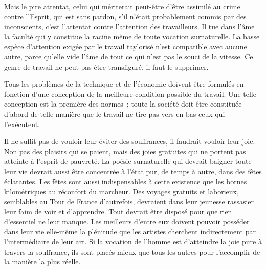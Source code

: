 \documentclass[french,twoside]{book} %
\newif\ifdev
\renewcommand{\LettrineFontHook}{\color{rubric}}
\newcommand{\initialiv}[2]{%
  \let\oldLFH\LettrineFontHook
  \IfSubStr{QJ’}{#1}{
    \lettrine[lines=4, lhang=0.2, loversize=-0.1, lraise=0.2]{\smash{#1}}{#2}
  }{\IfSubStr{É}{#1}{
    \lettrine[lines=4, lhang=0.2, loversize=-0, lraise=0]{\smash{#1}}{#2}
  }{\IfSubStr{ÀÂ}{#1}{
    \lettrine[lines=4, lhang=0.2, loversize=-0, lraise=0, slope=0.6em]{\smash{#1}}{#2}
  }{\IfSubStr{A}{#1}{
    \lettrine[lines=4, lhang=0.2, loversize=0.2, slope=0.6em]{\smash{#1}}{#2}
  }{\IfSubStr{V}{#1}{
    \lettrine[lines=4, lhang=0.2, loversize=0.2, slope=-0.5em]{\smash{#1}}{#2}
  }{
    \lettrine[lines=4, lhang=0.2, loversize=0.2]{\smash{#1}}{#2}
  }}}}}
  \let\LettrineFontHook\oldLFH
}
\renewcommand{\LettrineFontHook}{\bfseries\color{rubric}}
\begin{document}
Mais le pire attentat, celui qui mériterait peut-être d'être assimilé au crime contre l'Esprit, qui est sans pardon, s'il n’était probablement commis par des inconscients, c'est l'attentat contre l'attention des travailleurs. Il tue dans l'âme la faculté qui y constitue la racine même de toute vocation surnaturelle. La basse espèce d'attention exigée par le travail taylorisé n'est compatible avec aucune autre, parce qu'elle vide l'âme de tout ce qui n'est pas le souci de la vitesse. Ce genre de travail ne peut pas être transfiguré, il faut le supprimer.\par
Tous les problèmes de la technique et de l'économie doivent être formulés en fonction d'une conception de la meilleure condition possible du travail. Une telle conception est la première des normes ; toute la société doit être constituée d'abord de telle manière que le travail ne tire pas vers en bas ceux qui l'exécutent.\par
Il ne suffit pas de vouloir leur éviter des souffrances, il faudrait vouloir leur joie. Non pas des plaisirs qui se paient, mais des joies gratuites qui ne portent pas atteinte à l'esprit de pauvreté. La poésie surnaturelle qui devrait baigner toute leur vie devrait aussi être concentrée à l'état pur, de temps à autre, dans des fêtes éclatantes. Les fêtes sont aussi indispensables à cette existence que les bornes kilométriques au réconfort du marcheur. Des voyages gratuits et laborieux, semblables au Tour de France d'autrefois, devraient dans leur jeunesse rassasier leur faim de voir et d'apprendre. Tout devrait être disposé pour que rien d'essentiel ne leur manque. Les meilleurs d'entre eux doivent pouvoir posséder dans leur vie elle-même la plénitude que les artistes cherchent indirectement par l'intermédiaire de leur art. Si la vocation de l'homme est d'atteindre la joie pure à travers la souffrance, ils sont placés mieux que tous les autres pour l'accomplir de la manière la plus réelle.
 


\ifbooklet
  \newpage\null\thispagestyle{empty}\newpage
\fi

\ifdev %
\fontname\font — \textsc{Les règles du jeu}\par
(\hyperref[utopie]{\underline{Lien}})\par
\noindent \initialiv{A}{lors là}\blindtext\par
\noindent \initialiv{À}{ la bonheur des dames}\blindtext\par
\noindent \initialiv{É}{tonnez-le}\blindtext\par
\noindent \initialiv{Q}{ualitativement}\blindtext\par
\noindent \initialiv{V}{aloriser}\blindtext\par
\Blindtext
\phantomsection
\label{utopie}
\Blinddocument
\fi
\end{document}
